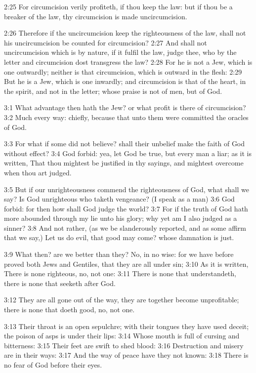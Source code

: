 2:25 For circumcision verily profiteth, if thou keep the law: but if thou be a breaker of the law, thy circumcision is made uncircumcision.

2:26 Therefore if the uncircumcision keep the righteousness of the law, shall not his uncircumcision be counted for circumcision?  2:27 And shall not uncircumcision which is by nature, if it fulfil the law, judge thee, who by the letter and circumcision dost transgress the law?  2:28 For he is not a Jew, which is one outwardly; neither is that circumcision, which is outward in the flesh: 2:29 But he is a Jew, which is one inwardly; and circumcision is that of the heart, in the spirit, and not in the letter; whose praise is not of men, but of God.

3:1 What advantage then hath the Jew? or what profit is there of circumcision?  3:2 Much every way: chiefly, because that unto them were committed the oracles of God.

3:3 For what if some did not believe? shall their unbelief make the faith of God without effect?  3:4 God forbid: yea, let God be true, but every man a liar; as it is written, That thou mightest be justified in thy sayings, and mightest overcome when thou art judged.

3:5 But if our unrighteousness commend the righteousness of God, what shall we say? Is God unrighteous who taketh vengeance? (I speak as a man) 3:6 God forbid: for then how shall God judge the world?  3:7 For if the truth of God hath more abounded through my lie unto his glory; why yet am I also judged as a sinner?  3:8 And not rather, (as we be slanderously reported, and as some affirm that we say,) Let us do evil, that good may come? whose damnation is just.

3:9 What then? are we better than they? No, in no wise: for we have before proved both Jews and Gentiles, that they are all under sin; 3:10 As it is written, There is none righteous, no, not one: 3:11 There is none that understandeth, there is none that seeketh after God.

3:12 They are all gone out of the way, they are together become unprofitable; there is none that doeth good, no, not one.

3:13 Their throat is an open sepulchre; with their tongues they have used deceit; the poison of asps is under their lips: 3:14 Whose mouth is full of cursing and bitterness: 3:15 Their feet are swift to shed blood: 3:16 Destruction and misery are in their ways: 3:17 And the way of peace have they not known: 3:18 There is no fear of God before their eyes.

